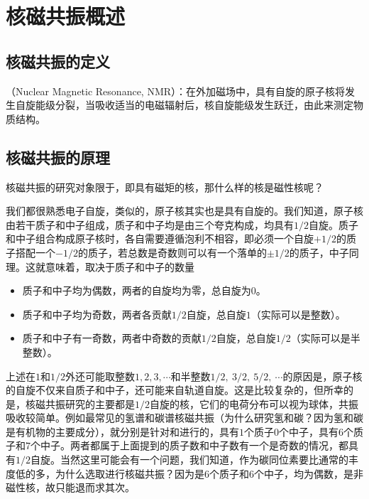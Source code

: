 \section{核磁共振概述}

\subsection{核磁共振的定义}
（Nuclear Magnetic Resonance, NMR）：在外加磁场中，具有自旋的原子核将发生自旋能级分裂，当吸收适当的电磁辐射后，核自旋能级发生跃迁，由此来测定物质结构。

\subsection{核磁共振的原理}
核磁共振的研究对象限于，即具有磁矩的核，那什么样的核是磁性核呢？

我们都很熟悉电子自旋，类似的，原子核其实也是具有自旋的。我们知道，原子核由若干质子和中子组成，质子和中子均是由三个夸克构成，均具有$1/2$自旋。质子和中子组合构成原子核时，各自需要遵循泡利不相容，即必须一个自旋$+1/2$的质子搭配一个$-1/2$的质子，若总数是奇数则可以有一个落单的$\pm 1/2$的质子，中子同理。这就意味着，取决于质子和中子的数量
\begin{itemize}
    \item 质子和中子均为偶数，两者的自旋均为零，总自旋为$0$。
    \item 质子和中子均为奇数，两者各贡献$1/2$自旋，总自旋$1$（实际可以是整数）。
    \item 质子和中子有一奇数，两者中奇数的贡献$1/2$自旋，总自旋$1/2$（实际可以是半整数）。
\end{itemize}
上述在$1$和$1/2$外还可能取整数$1,2,3,\cdots$和半整数$1/2,\ 3/2,\ 5/2,\ \cdots $的原因是，原子核的自旋不仅来自质子和中子，还可能来自轨道自旋。这是比较复杂的，但所幸的是，核磁共振研究的主要都是$1/2$自旋的核，它们的电荷分布可以视为球体，共振吸收较简单。例如最常见的氢谱和碳谱核磁共振（为什么研究氢和碳？因为氢和碳是有机物的主要成分），就分别是针对和进行的，具有$1$个质子$0$个中子，具有$6$个质子和$7$个中子。两者都属于上面提到的质子数和中子数有一个是奇数的情况，都具有$1/2$自旋。当然这里可能会有一个问题，我们知道，作为碳同位素要比通常的丰度低的多，为什么选取进行核磁共振？因为是$6$个质子和$6$个中子，均为偶数，是非磁性核，故只能退而求其次。\goodbreak

